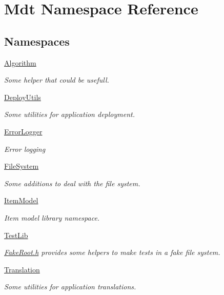 \hypertarget{namespace_mdt}{}\section{Mdt Namespace Reference}
\label{namespace_mdt}
\subsection*{Namespaces}
\begin{DoxyCompactItemize}
\item 
 \hyperlink{namespace_mdt_1_1_algorithm}{Algorithm}
\begin{DoxyCompactList}\small\item\em Some helper that could be usefull. \end{DoxyCompactList}\item 
 \hyperlink{namespace_mdt_1_1_deploy_utils}{Deploy\+Utils}
\begin{DoxyCompactList}\small\item\em Some utilities for application deployment. \end{DoxyCompactList}\item 
 \hyperlink{namespace_mdt_1_1_error_logger}{Error\+Logger}
\begin{DoxyCompactList}\small\item\em Error logging \end{DoxyCompactList}\item 
 \hyperlink{namespace_mdt_1_1_file_system}{File\+System}
\begin{DoxyCompactList}\small\item\em Some additions to deal with the file system. \end{DoxyCompactList}\item 
 \hyperlink{namespace_mdt_1_1_item_model}{Item\+Model}
\begin{DoxyCompactList}\small\item\em Item model library namespace. \end{DoxyCompactList}\item 
 \hyperlink{namespace_mdt_1_1_test_lib}{Test\+Lib}
\begin{DoxyCompactList}\small\item\em \hyperlink{_fake_root_8h_source}{Fake\+Root.\+h} provides some helpers to make tests in a fake file system. \end{DoxyCompactList}\item 
 \hyperlink{namespace_mdt_1_1_translation}{Translation}
\begin{DoxyCompactList}\small\item\em Some utilities for application translations. \end{DoxyCompactList}\end{DoxyCompactItemize}
